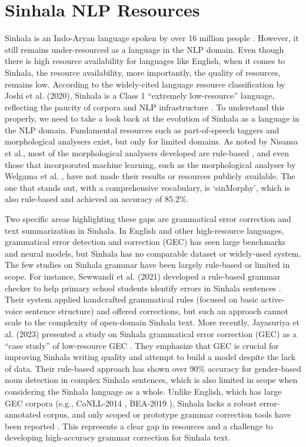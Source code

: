 \documentclass[12pt]{uomthesis}
\begin{document}
\section{Sinhala NLP Resources}
Sinhala is an Indo-Aryan language spoken by over 16 million people \cite{2}. However, it still remains under-resourced as a language in the NLP domain. Even though there is high resource availability for languages like English, when it comes to Sinhala, the resource availability, more importantly, the quality of resources, remains low. According to the widely-cited language resource classification by Joshi et al. (2020), Sinhala is a Class 1 “extremely low-resource” language, reflecting the paucity of corpora and NLP infrastructure \cite{joshi2020}. To understand this properly, we need to take a look back at the evolution of Sinhala as a language in the NLP domain. Fundamental resources such as part-of-speech taggers and morphological analysers exist, but only for limited domains. As noted by Nisansa et al., most of the morphological analysers developed are rule-based \cite{1}, and even those that incorporated machine learning, such as the morphological analyser by Welgama et al. \cite{3}, have not made their results or resources publicly available. The one that stands out, with a comprehensive vocabulary, is `sinMorphy', which is also rule-based and achieved an accuracy of 85.2\%.

Two specific areas highlighting these gaps are grammatical error correction and text summarization in Sinhala. In English and other high-resource languages, grammatical error detection and correction (GEC) has seen large benchmarks and neural models, but Sinhala has no comparable dataset or widely-used system. The few studies on Sinhala grammar have been largely rule-based or limited in scope. For instance, Sewwandi et al. (2021) developed a rule-based grammar checker to help primary school students identify errors in Sinhala sentences \cite{5}. Their system applied handcrafted grammatical rules (focused on basic active-voice sentence structure) and offered corrections, but such an approach cannot scale to the complexity of open-domain Sinhala text. More recently, Jayasuriya et al. (2023) presented a study on Sinhala grammatical error correction (GEC) as a “case study” of low-resource GEC \cite{6}. They emphasize that GEC is crucial for improving Sinhala writing quality and attempt to build a model despite the lack of data. Their rule-based approach has shown over 90\% accuracy for gender-based noun detection in complex Sinhala sentences, which is also limited in scope when considering the Sinhala language as a whole. Unlike English, which has large GEC corpora (e.g., CoNLL-2014 \cite{7}, BEA-2019 \cite{8}), Sinhala lacks a robust error-annotated corpus, and only scoped or prototype grammar correction tools have been reported \cite{1}. This represents a clear gap in resources and a challenge to developing high-accuracy grammar correction for Sinhala text.
\end{document}
